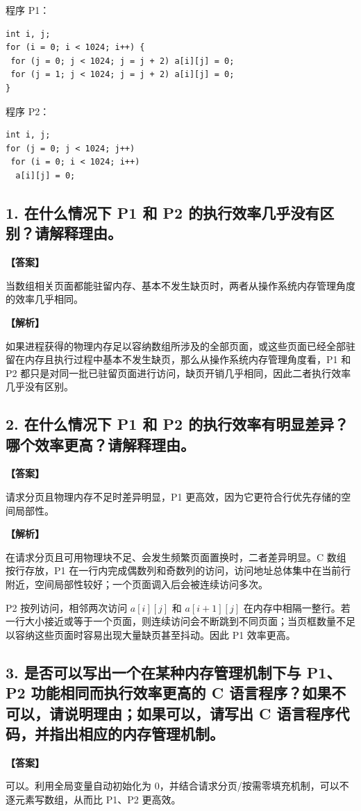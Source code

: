 \documentclass[UTF8,12pt]{ctexart}
\newenvironment{explanation}{\par\noindent\textbf{【解析】}\par\smallskip}{\par\medskip}
\newenvironment{answer}{\par\noindent\textbf{【答案】}\par\smallskip}{\par}
\begin{document}
程序 P1：
\begin{lstlisting}
int i, j;
for (i = 0; i < 1024; i++) {
 for (j = 0; j < 1024; j = j + 2) a[i][j] = 0;
 for (j = 1; j < 1024; j = j + 2) a[i][j] = 0;
}
\end{lstlisting}

程序 P2：
\begin{lstlisting}
int i, j;
for (j = 0; j < 1024; j++)
 for (i = 0; i < 1024; i++)
  a[i][j] = 0;
\end{lstlisting}

\subsection*{1. 在什么情况下 P1 和 P2 的执行效率几乎没有区别？请解释理由。}
\begin{answer}
当数组相关页面都能驻留内存、基本不发生缺页时，两者从操作系统内存管理角度的效率几乎相同。
\end{answer}

\begin{explanation}
如果进程获得的物理内存足以容纳数组所涉及的全部页面，或这些页面已经全部驻留在内存且执行过程中基本不发生缺页，那么从操作系统内存管理角度看，P1 和 P2 都只是对同一批已驻留页面进行访问，缺页开销几乎相同，因此二者执行效率几乎没有区别。
\end{explanation}
\subsection*{2. 在什么情况下 P1 和 P2 的执行效率有明显差异？哪个效率更高？请解释理由。}
\begin{answer}
请求分页且物理内存不足时差异明显，P1 更高效，因为它更符合行优先存储的空间局部性。
\end{answer}

\begin{explanation}
在请求分页且可用物理块不足、会发生频繁页面置换时，二者差异明显。C 数组按行存放，P1 在一行内完成偶数列和奇数列的访问，访问地址总体集中在当前行附近，空间局部性较好；一个页面调入后会被连续访问多次。

P2 按列访问，相邻两次访问 $a[i][j]$ 和 $a[i+1][j]$ 在内存中相隔一整行。若一行大小接近或等于一个页面，则连续访问会不断跳到不同页面；当页框数量不足以容纳这些页面时容易出现大量缺页甚至抖动。因此 P1 效率更高。
\end{explanation}
\subsection*{3. 是否可以写出一个在某种内存管理机制下与 P1、P2 功能相同而执行效率更高的 C 语言程序？如果不可以，请说明理由；如果可以，请写出 C 语言程序代码，并指出相应的内存管理机制。}
\begin{answer}
可以。利用全局变量自动初始化为 0，并结合请求分页/按需零填充机制，可以不逐元素写数组，从而比 P1、P2 更高效。
\end{answer}
\end{document}

